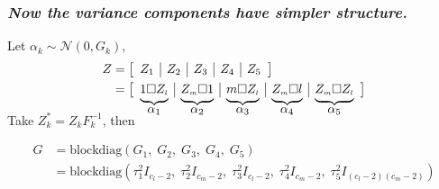\documentclass[12pt]{beamer}
\newcommand{\ms}{\scriptscriptstyle}
\newcommand\coolunderbrace[2]{\mathrlap{\smash{%
\underbrace{\phantom{\begin{matrix} #2 %
\end{matrix}}}_{\mbox{$#1$}}}}#2}
\begin{document}
\begin{frame}
\frametitle{\emph{Now the variance components have simpler structure.}}

Let $\alpha_k \sim \mathcal{N}\left(0,G_k\right)$,
\begin{align*}
Z &= \left[\begin{array}{c|c|c|c|c} Z_1 & Z_2 & Z_3 & Z_4 & Z_5\end{array} \right]\\
&= \left[\begin{array}{c|c|c|c|c} \coolunderbrace{\alpha_1}{1 \square Z_{\ms l}}  & \coolunderbrace{\alpha_2}{Z_{\ms m} \square 1} & \coolunderbrace{\alpha_3}{m \square  Z_{\ms l}} & \coolunderbrace{\alpha_4}{ Z_{\ms m} \square l} &  \coolunderbrace{\alpha_5}{Z_{\ms m} \square  Z_{\ms l} } \end{array} \right]
\end{align*}

\vspace{0.2in}
Take $Z_k^* = Z_k F_k^{-1}$, then

\begin{align*}
G  &= \mbox{blockdiag}\left(G_1,\;G_2,\;G_3,\;G_4,\;G_5 \right)\\
  &= \mbox{blockdiag}\left(\tau_1^2 I_{{\ms c_l - 2}},\; \tau_2^2 I_{{\ms c_m - 2}},\;\tau_3^2 I_{{\ms c_l - 2}},\;\tau_4^2 I_{{\ms c_m - 2}},\;\tau_5^2 I_{{\ms \left(c_l - 2\right) \left(c_m - 2\right)}} \right)\\
\end{align*}

\end{frame}




%
%
%
%
%
\end{document}
